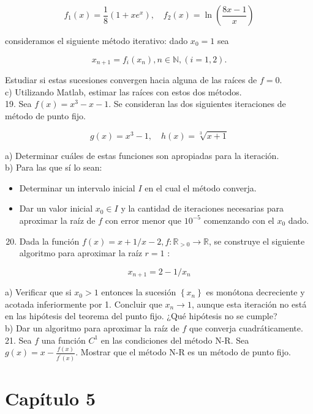 \documentclass[10pt]{article}
\begin{document}
$$
f_{1}(x)=\frac{1}{8}\left(1+x e^{x}\right), \quad f_{2}(x)=\ln \left(\frac{8 x-1}{x}\right)
$$

consideramos el siguiente método iterativo: dado $x_{0}=1$ sea

$$
x_{n+1}=f_{i}\left(x_{n}\right), n \in \mathbb{N},(i=1,2) .
$$

Estudiar si estas sucesiones convergen hacia alguna de las raíces de $f=0$.\\
c) Utilizando Matlab, estimar las raíces con estos dos métodos.\\
19. Sea $f(x)=x^{3}-x-1$. Se consideran las dos siguientes iteraciones de método de punto fijo.

$$
g(x)=x^{3}-1, \quad h(x)=\sqrt[3]{x+1}
$$

a) Determinar cuáles de estas funciones son apropiadas para la iteración.\\
b) Para las que sí lo sean:

\begin{itemize}
  \item Determinar un intervalo inicial $I$ en el cual el método converja.
  \item Dar un valor inicial $x_{0} \in I$ y la cantidad de iteraciones necesarias para aproximar la raíz de $f$ con error menor que $10^{-5}$ comenzando con el $x_{0}$ dado.
\end{itemize}

\begin{enumerate}
  \setcounter{enumi}{19}
  \item Dada la función $f(x)=x+1 / x-2, f: \mathbb{R}_{>0} \rightarrow \mathbb{R}$, se construye el siguiente algoritmo para aproximar la raíz $r=1$ :
\end{enumerate}

$$
x_{n+1}=2-1 / x_{n}
$$

a) Verificar que si $x_{0}>1$ entonces la sucesión $\left\{x_{n}\right\}$ es monótona decreciente y acotada inferiormente por 1. Concluir que $x_{n} \rightarrow 1$, aunque esta iteración no está en las hipótesis del teorema del punto fijo. ¿Qué hipótesis no se cumple?\\
b) Dar un algoritmo para aproximar la raíz de $f$ que converja cuadráticamente.\\
21. Sea $f$ una función $C^{1}$ en las condiciones del método N-R. Sea $g(x)=x-\frac{f(x)}{f^{\prime}(x)}$. Mostrar que el método N-R es un método de punto fijo.

\section*{Capítulo 5}
\end{document}
